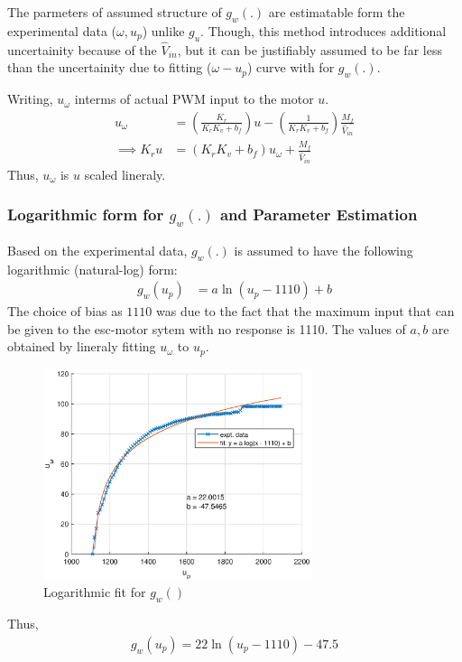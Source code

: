 The parmeters of assumed structure of $g_w(.)$ are estimatable form the experimental data ($\omega, u_p$) unlike $g_u$. Though, this method introduces additional uncertainity because of the $\hat V_{in}$, but it can be justifiably assumed to be far less than the uncertainity due to fitting ($\omega-u_p$) curve with for $g_w(.)$.

Writing, $u_{\omega}$ interms of actual PWM input to the motor $u$.
\begin{align*}
    u_{\omega} &= \left(\frac{K_r}{K_r K_v  + b_f} \right) u - \left(\frac{1}{K_r K_v  + b_f} \right) \frac{M_f}{\hat V_{in}}\\
    \implies K_r u &= (K_r K_v  + b_f) u_\omega + \frac{M_f}{\hat V_{in}}
\end{align*}
Thus, $u_{\omega}$ is $u$ scaled lineraly.

\subsubsection{Logarithmic form for $g_w(.)$ and Parameter Estimation}

Based on the experimental data, $g_w(.)$ is assumed to have the following logarithmic (natural-log) form:
\begin{align*}
    g_w(u_p) &= a \ln(u_p - 1110) + b
\end{align*}
The choice of bias as $1110$ was due to the fact that the maximum input that can be given to the esc-motor sytem with no response is 1110. The values of $a, b$ are obtained by lineraly fitting $u_\omega$ to $u_p$.

\begin{figure}[H]
    \centering
    \includegraphics[width = 0.7\textwidth]{./figs/norm_omega/g_w.eps}
    \caption{Logarithmic fit for $g_w()$}
\end{figure}
Thus,
\begin{align*}
    \boxed{g_w(u_p) = 22 \ln(u_p - 1110)- 47.5 }
\end{align*}
